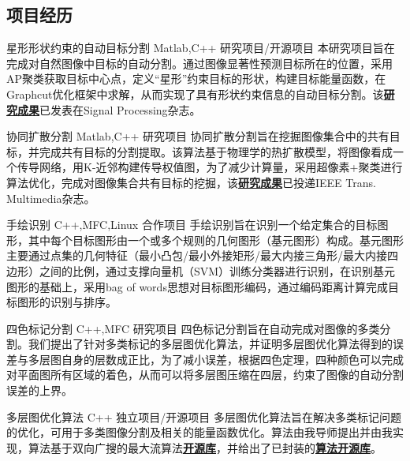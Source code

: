 \documentclass[11pt,a4paper,sans]{moderncv}   %
\begin{document}
\begin{CJK}{UTF8}{gbsn}
\section{项目经历}
\renewcommand{\baselinestretch}{1.2}

{星形形状约束的自动目标分割}
{Matlab,C++}
{研究项目/开源项目}{}
{本研究项目旨在完成对自然图像中目标的自动分割。通过图像显著性预测目标所在的位置，采用AP聚类获取目标中心点，定义“星形”约束目标的形状，构建目标能量函数，在Graphcut优化框架中求解，从而实现了具有形状约束信息的自动目标分割。该\textbf{\href{http://www.sciencedirect.com/science/article/pii/S0165168414002163}{研究成果}}已发表在Signal Processing杂志。}
\vspace*{0.2\baselineskip}

{协同扩散分割}
{Matlab,C++}
{研究项目}{}
{协同扩散分割旨在挖掘图像集合中的共有目标，并完成共有目标的分割提取。该算法基于物理学的热扩散模型，将图像看成一个传导网络，用K-近邻构建传导权值图，为了减少计算量，采用超像素+聚类进行算法优化，完成对图像集合共有目标的挖掘，该\textbf{\href{http://files.cnblogs.com/moondark/XiangliLiao_CoDiffusion.pdf}{研究成果}}已投递IEEE Trans. Multimedia杂志。}
\vspace*{0.2\baselineskip}

{手绘识别}
{C++,MFC,Linux}
{合作项目}{}
{手绘识别旨在识别一个给定集合的目标图形，其中每个目标图形由一个或多个规则的几何图形（基元图形）构成。基元图形主要通过点集的几何特征（最小凸包/最小外接矩形/最大内接三角形/最大内接四边形）之间的比例，通过支撑向量机（SVM）训练分类器进行识别，在识别基元图形的基础上，采用bag of words思想对目标图形编码，通过编码距离计算完成目标图形的识别与排序。}
\vspace*{0.2\baselineskip}

{四色标记分割}
{C++,MFC}
{研究项目}{}
{四色标记分割旨在自动完成对图像的多类分割。我们提出了针对多类标记的多层图优化算法，并证明多层图优化算法得到的误差与多层图自身的层数成正比，为了减小误差，根据四色定理，四种颜色可以完成对平面图所有区域的着色，从而可以将多层图压缩在四层，约束了图像的自动分割误差的上界。}
\vspace*{0.2\baselineskip}

{多层图优化算法}
{C++}
{独立项目/开源项目}{}
{多层图优化算法旨在解决多类标记问题的优化，可用于多类图像分割及相关的能量函数优化。算法由我导师提出并由我实现，算法基于双向广搜的最大流算法\textbf{\href{http://vision.csd.uwo.ca/code/}{开源库}}，并给出了已封装的\textbf{\href{https://github.com/liaoxl/MultiLayerGraph}{算法开源库}}。}
\vspace*{0.2\baselineskip}


\end{CJK}
\end{document}
